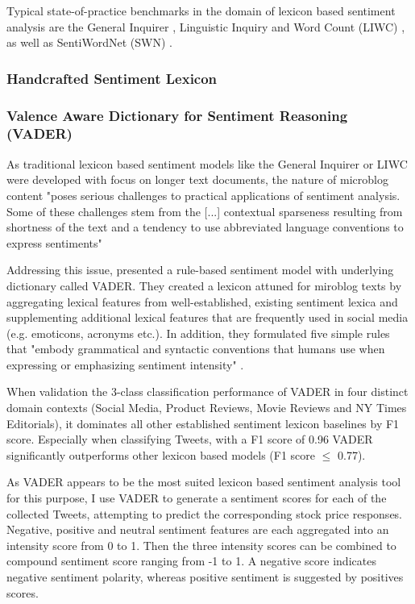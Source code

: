 \documentclass[a4paper,12pt]{article}%
\begin{document}
Typical state-of-practice benchmarks in the domain of lexicon based sentiment analysis are the General Inquirer \citep{Stone1966}, Linguistic Inquiry and Word Count (LIWC) \citep{Pennebaker2001, Pennebaker2007}, as well as SentiWordNet (SWN) \citep{Baccianella2010}.


\subsubsection{Handcrafted Sentiment Lexicon}
\subsubsection{Valence Aware Dictionary for Sentiment Reasoning (VADER)}
As traditional lexicon based sentiment models like the General Inquirer or LIWC were developed with focus on longer text documents, the nature of microblog content "poses serious challenges to practical applications of sentiment analysis. Some of these challenges stem from the [...] contextual sparseness resulting from shortness of the text and a tendency to use abbreviated language conventions to express sentiments" \citep{Hutto2014}

Addressing this issue, \citet{Hutto2014} presented a rule-based sentiment model with underlying dictionary called VADER. They created a lexicon attuned for miroblog texts by aggregating lexical features from well-established, existing sentiment lexica and supplementing additional lexical features that are frequently used in social media (e.g. emoticons, acronyms etc.). In addition, they formulated five simple rules that "embody grammatical and syntactic conventions that humans use when expressing or emphasizing sentiment intensity" \citep{Hutto2014}. 

When validation the 3-class classification performance of VADER in four distinct domain contexts (Social Media, Product Reviews, Movie Reviews and NY Times Editorials), it dominates all other established sentiment lexicon baselines by F1 score. Especially when classifying Tweets, with a F1 score of 0.96 VADER significantly outperforms other lexicon based models (F1 score $\leq$ 0.77).

As VADER appears to be the most suited lexicon based sentiment analysis tool for this purpose, I use VADER to generate a sentiment scores for each of the collected Tweets, attempting to predict the corresponding stock price responses. Negative, positive and neutral sentiment features are each aggregated into an intensity score from 0 to 1. Then the three intensity scores can be combined to compound sentiment score ranging from -1 to 1. A negative score indicates negative sentiment polarity, whereas positive sentiment is suggested by positives scores.
\end{document}
